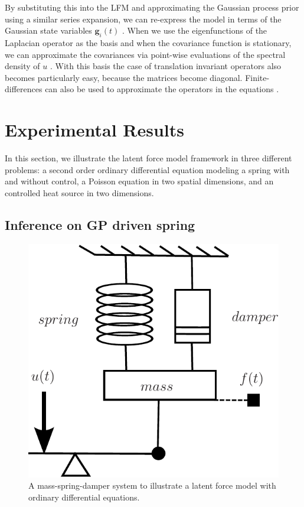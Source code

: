 \documentclass[journal]{IEEEtran}
\newcommand{\simo}[1]{{\color{red}#1}}
\begin{document}
By substituting this into the LFM and approximating the Gaussian process prior using a similar series expansion, we can re-express the model in terms of the Gaussian state variables $\mathbf{g}_i(t)$ \cite{Sarkka+Hartikainen:2012}. When we use the eigenfunctions of the Laplacian operator as the basis and when the covariance function is stationary, we can approximate the covariances via point-wise evaluations of the spectral density of $u$ \cite{Solin+Sarkka:2014}. With this basis the case of translation invariant operators also becomes particularly easy, because the matrices become diagonal. Finite-differences can also be used to approximate the operators in the equations \cite{Lindgren+Rue+Lindstrom:2011}.

%

\section{Experimental Results}

In this section, we illustrate the latent force model framework in three different problems: a second order ordinary differential equation modeling a spring with and without control, a Poisson equation in two spatial dimensions, and an controlled heat source in two dimensions.

\subsection{Inference on GP driven spring}
%
\begin{figure}[!t]
\centering
\includegraphics[width=0.5\columnwidth]{massSpringDamper}
\caption{A mass-spring-damper system to illustrate a latent force model with ordinary differential equations.}
\label{mass:spring:damper:figure}
\end{figure}
\end{document}
